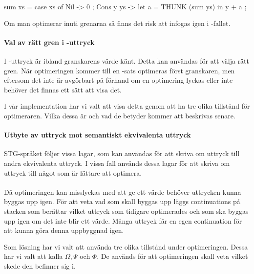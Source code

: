 \documentclass[Rapport]{subfiles}
\begin{document}
\begin{codeEx}
sum xs = case xs of
    { Nil -> 0
    ; Cons y ys -> let
        { a = THUNK (sum ys)
        } in y + a
    };
\end{codeEx}

Om man optimerar  inuti grenarna så finns det risk att  infogas
igen i -fallet.

\paragraph{ Val av rätt gren i -uttryck }

I -uttryck är ibland granskarens värde känt. Detta kan användas
för att välja rätt gren. När optimeringen kommer till en -sats optimeras först granskaren,
men eftersom det inte är avgörbart på förhand om en optimering lyckas eller inte
behöver det finnas ett sätt att visa det. 

I vår implementation har vi valt att visa detta genom att ha tre olika tillstånd
för optimeraren. Vilka dessa är och vad de betyder kommer att beskrivas senare.

\paragraph{ Utbyte av uttryck mot semantiskt ekvivalenta uttryck}

STG-språket följer vissa lagar, som kan användas för att skriva om uttryck
till andra ekvivalenta uttryck. I vissa fall används dessa lagar för att skriva om
uttryck till något som är lättare att optimera.

\paragraph{}

Då optimeringen kan misslyckas med att ge ett värde behöver uttrycken kunna byggas upp
igen. För att veta vad som skall byggas upp läggs continuations på stacken
som berättar vilket uttryck som tidigare optimerades och som ska byggas upp igen om det
inte blir ett värde. Många uttryck får en egen continuation för att kunna göra denna
uppbyggnad igen.



Som lösning har vi valt att använda tre olika tillstånd under optimeringen. Dessa har vi valt att kalla
$\Omega, \Psi$ och $\Phi$. De används för att optimeringen skall veta vilket skede den
befinner sig i. 
\end{document}
